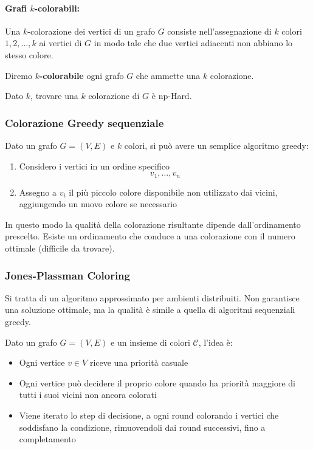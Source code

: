 \paragraph{Grafi $k$-colorabili:} Una $k$-colorazione dei vertici di un grafo $G$ consiste nell'assegnazione di $k$ colori $1, 2, \dots, k$ ai vertici di $G$ in modo tale che due vertici adiacenti non abbiano lo stesso colore.

Diremo \textbf{$k$-colorabile} ogni grafo $G$ che ammette una $k$ colorazione.

Dato $k$, trovare una $k$ colorazione di $G$ è np-Hard.

\subsubsection{Colorazione Greedy sequenziale}

Dato un grafo $G = (V,E)$ e $k$ colori, si può avere un semplice algoritmo greedy:
\begin{enumerate}
    \item Considero i vertici in un ordine specifico
    $$ v_1, \dots, v_n $$
    
    \item Assegno a $v_i$ il più piccolo colore disponibile non utilizzato dai vicini, aggiungendo un nuovo colore se necessario
\end{enumerate}

In questo modo la qualità della colorazione risultante dipende dall'ordinamento prescelto. Esiste un ordinamento che conduce a una colorazione con il numero ottimale (difficile da trovare).

\subsubsection{Jones-Plassman Coloring}

Si tratta di un algoritmo approssimato per ambienti distribuiti. Non garantisce una soluzione ottimale, ma la qualità è simile a quella di algoritmi sequenziali greedy.

Dato un grafo $G = (V,E)$ e un insieme di colori $\mathcal{C}$, l'idea è:
\begin{itemize}
    \item Ogni vertice $v \in V$ riceve una priorità casuale
    
    \item Ogni vertice può decidere il proprio colore quando ha priorità maggiore di tutti i suoi vicini non ancora colorati
    
    \item Viene iterato lo step di decisione, a ogni round colorando i vertici che soddisfano la condizione, rimuovendoli dai round successivi, fino a completamento 
\end{itemize}

